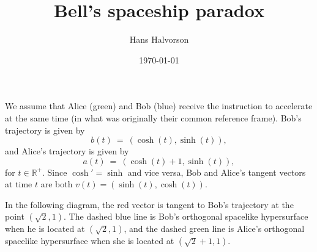 \documentclass[tikz,border=10pt,fleqn]{article}
\title{Bell's spaceship paradox}
\author{Hans Halvorson}
\date{\today}
\theoremstyle{definition}
\begin{document}
\maketitle

We assume that Alice (green) and Bob (blue) receive the instruction to
accelerate at the same time (in what was originally their common
reference frame). Bob's trajectory is given by
\[ b(t) \: = \: (\cosh (t),\sinh (t)) , \] and Alice's trajectory is given by
\[ a(t) \: = \: (\cosh (t)+1,\sinh (t)) ,\] for
$t\in\mathbb{R}^+$. Since $\cosh '=\sinh$ and vice versa, Bob and
Alice's tangent vectors at time $t$ are both
$v(t)=(\sinh (t),\cosh (t))$.

In the following diagram, the red vector is tangent to Bob's
trajectory at the point $(\sqrt{2},1)$. The dashed blue line is Bob's
orthogonal spacelike hypersurface when he is located at
$(\sqrt{2},1)$, and the dashed green line is Alice's orthogonal
spacelike hypersurface when she is located at $(\sqrt{2}+1,1)$.

\bigskip \noindent {}
\end{document}
